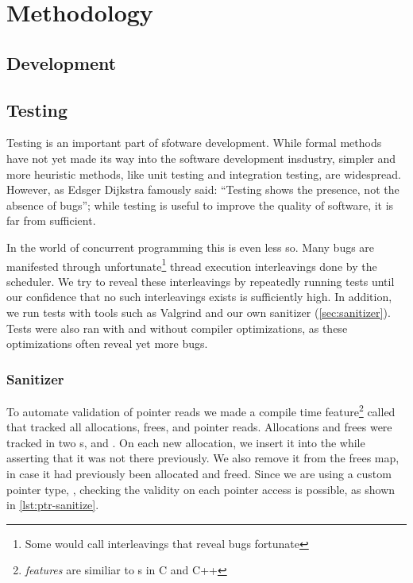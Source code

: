 \chapter{Methodology}
\lorem{}


\section{Development}
\lorem{}


\section{Testing}

Testing is an important part of sfotware development. While formal methods have not yet made its
way into the software development insdustry, simpler and more heuristic methods, like unit testing
and integration testing, are widespread. However, as Edsger Dijkstra famously said: ``Testing shows
the presence, not the absence of bugs''\cite{buxton1970software}; while testing is useful to
improve the quality of software, it is far from sufficient.

In the world of concurrent programming this is even less so. Many bugs are manifested through
unfortunate\footnote{Some would call interleavings that reveal bugs fortunate} thread execution
interleavings done by the scheduler. We try to reveal these interleavings by repeatedly running
tests until our confidence that no such interleavings exists is sufficiently high. In addition, we
run tests with tools such as Valgrind\cite{valgrind} and our own sanitizer (\cref{sec:sanitizer}).
Tests were also ran with and without compiler optimizations, as these optimizations often reveal
yet more bugs.


\subsection{Sanitizer\label{sec:sanitizer}}

To automate validation of pointer reads we made a compile time feature\footnote{\emph{features} are
similiar to s in C and C++} called  that tracked all allocations,
frees, and pointer reads.  Allocations and frees were tracked in two s,
 and .  On each new allocation, we insert it into the 
while asserting that it was not there previously. We also remove it from the frees map, in case it
had previously been allocated and freed. Since we are using a custom pointer type, ,
checking the validity on each pointer access is possible, as shown in \cref{lst:ptr-sanitize}.

